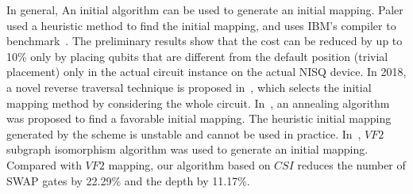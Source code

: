 \documentclass[runningheads]{llncs}
\begin{document}
In general, An initial algorithm can be used to generate an initial mapping. 
Paler used a heuristic method to find the initial mapping, 
 and uses IBM's compiler to benchmark~\cite{Paler2018}. 
The preliminary results show that the cost can be reduced by up to 10\% only by placing qubits 
that are different from the default position (trivial placement) only in the actual circuit instance 
on the actual NISQ device. In 2018, a novel reverse traversal technique is proposed in~\cite{Li2018}, 
which selects the initial mapping method by considering the whole circuit. 
In~\cite{Xiangzhen2020}, an annealing algorithm was proposed to find a favorable 
initial mapping. 
The heuristic initial mapping generated by the scheme is unstable 
and cannot be used in practice. In~\cite{2020Qubit}, 
$VF2$ subgraph isomorphism algorithm was 
used to generate an initial mapping. 
Compared with $VF2$ mapping, our algorithm 
based on $CSI$ reduces 
the number of SWAP gates by 22.29\% and the depth by 11.17\%.
\end{document}
